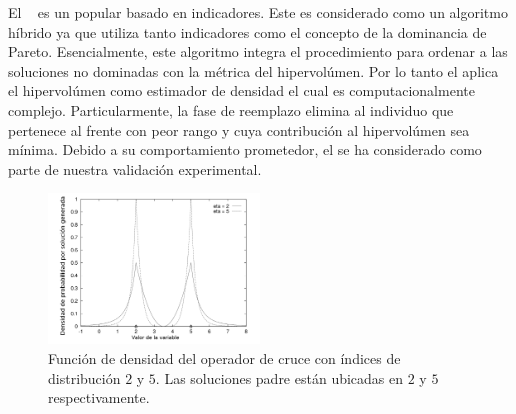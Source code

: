 El \SMSEMOA{}~\cite{Joel:SMSEMOA} es un \MOEA{} popular basado en indicadores.
%
Este \MOEA{} es considerado como un algoritmo híbrido ya que utiliza tanto indicadores como el concepto de la dominancia de Pareto.
%
Esencialmente, este algoritmo integra el procedimiento para ordenar a las soluciones no dominadas con la métrica del hipervolúmen.
%
Por lo tanto el \SMSEMOA{} aplica el hipervolúmen como estimador de densidad el cual es computacionalmente complejo.
%
Particularmente, la fase de reemplazo elimina al individuo que pertenece al frente con peor rango y cuya contribución al hipervolúmen sea mínima.
%
Debido a su comportamiento prometedor, el \SMSEMOA{} se ha considerado como parte de nuestra validación experimental.
%

\begin{figure}[!t]
\centering
\includegraphics[width=0.5\textwidth]{img/Operadores/DensitySBX.png} 
\caption{Función de densidad del operador de cruce \SBX{} con índices de distribución $2$ y $5$. Las soluciones padre están ubicadas en $2$ y $5$ respectivamente.}
\label{fig:fig_sim}
\end{figure}

